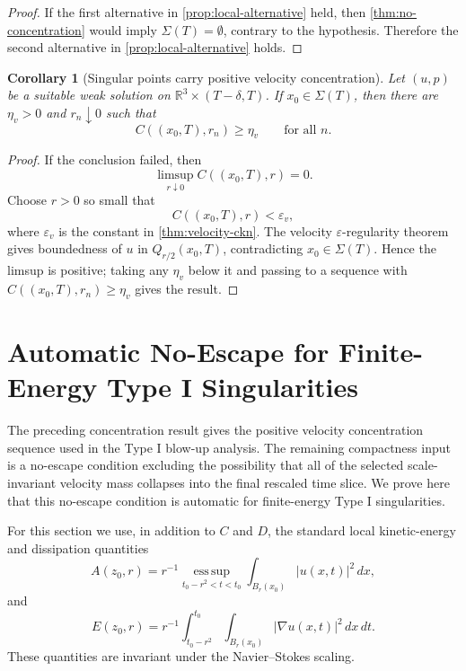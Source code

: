 \documentclass[11pt]{amsart}
\theoremstyle{plain}
\newtheorem{corollary}[corollary]{Corollary}
\theoremstyle{definition}
\theoremstyle{remark}
\begin{document}
\begin{proof}
If the first alternative in \cref{prop:local-alternative} held, then
\cref{thm:no-concentration} would imply \(\Sigma(T)=\emptyset\), contrary to
the hypothesis.  Therefore the second alternative in
\cref{prop:local-alternative} holds.
\end{proof}

\begin{corollary}[Singular points carry positive velocity concentration]
\label{cor:velocity-concentration}
Let \((u,p)\) be a suitable weak solution on
\(\mathbb R^3\times(T-\delta,T)\).  If \(x_0\in\Sigma(T)\), then there are
\(\eta_v>0\) and \(r_n\downarrow0\) such that
\[
  C((x_0,T),r_n)\ge\eta_v
  \qquad\text{for all }n.
\]
\end{corollary}

\begin{proof}
If the conclusion failed, then
\[
  \limsup_{r\downarrow0} C((x_0,T),r)=0.
\]
Choose \(r>0\) so small that
\[
  C((x_0,T),r)<\varepsilon_v,
\]
where \(\varepsilon_v\) is the constant in
\cref{thm:velocity-ckn}.  The velocity \(\varepsilon\)-regularity theorem gives
boundedness of \(u\) in \(Q_{r/2}(x_0,T)\), contradicting
\(x_0\in\Sigma(T)\).  Hence the limsup is positive; taking any
\(\eta_v\) below it and passing to a sequence with
\(C((x_0,T),r_n)\ge\eta_v\) gives the result.
\end{proof}

\section{Automatic No-Escape for Finite-Energy Type I Singularities}
\label{sec:auto-no-escape}

The preceding concentration result gives the positive velocity concentration
sequence used in the Type I blow-up analysis.  The remaining compactness input
is a no-escape condition excluding the possibility that all of the selected
scale-invariant velocity mass collapses into the final rescaled time slice.
We prove here that this no-escape condition is automatic for finite-energy
Type I singularities.

For this section we use, in addition to \(C\) and \(D\), the standard local
kinetic-energy and dissipation quantities
\[
  A(z_0,r)
  =r^{-1}\operatorname*{ess\,sup}_{t_0-r^2<t<t_0}
    \int_{B_r(x_0)} |u(x,t)|^2\,dx,
\]
and
\[
  E(z_0,r)
  =r^{-1}\int_{t_0-r^2}^{t_0}\int_{B_r(x_0)}
    |\nabla u(x,t)|^2\,dx\,dt .
\]
These quantities are invariant under the Navier--Stokes scaling.
\end{document}

